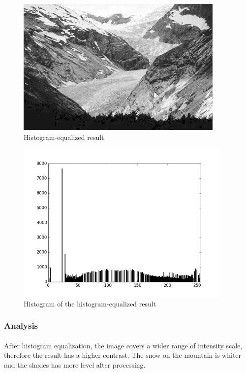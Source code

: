 \documentclass{article}
\begin{document}
\begin{figure}[H]
	\centering
	\includegraphics[width=288pt]{../result/equalize.png}
	\caption{Histogram-equalized result}
\end{figure}

\begin{figure}[H]
	\centering
	\includegraphics[width=300pt]{../result/hist-equalize.png}
	\caption{Histogram of the histogram-equalized result}
\end{figure}

\subsubsection{Analysis}

\paragraph{}
After histogram equalization, the image covers a wider range of intensity scale, therefore the result has a higher contrast. The snow on the mountain is whiter and the shades has more level after processing.
\end{document}
